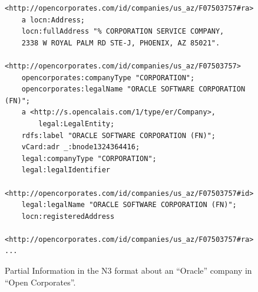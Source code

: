 \documentclass{llncs}
\begin{document}
\begin{itemize}
\begin{figure}[!h]
\begin{center}
\begin{lstlisting}[language=SPARQL]
<http://opencorporates.com/id/companies/us_az/F07503757#ra> 
	a locn:Address;
	locn:fullAddress "% CORPORATION SERVICE COMPANY, 
	2338 W ROYAL PALM RD STE-J, PHOENIX, AZ 85021".

<http://opencorporates.com/id/companies/us_az/F07503757> 
	opencorporates:companyType "CORPORATION";
	opencorporates:legalName "ORACLE SOFTWARE CORPORATION (FN)";
	a <http://s.opencalais.com/1/type/er/Company>,
		legal:LegalEntity;
	rdfs:label "ORACLE SOFTWARE CORPORATION (FN)";
	vCard:adr _:bnode1324364416;
	legal:companyType "CORPORATION";
	legal:legalIdentifier 
	  <http://opencorporates.com/id/companies/us_az/F07503757#id>;
	legal:legalName "ORACLE SOFTWARE CORPORATION (FN)";
	locn:registeredAddress 
	  <http://opencorporates.com/id/companies/us_az/F07503757#ra>.
...
\end{lstlisting}
\caption{Partial Information in the N3 format about an ``Oracle'' company in ``Open Corporates''.}
\label{figure:open}
\end{center}
\end{figure}
 
 
\end{itemize}

% 

\end{document}
